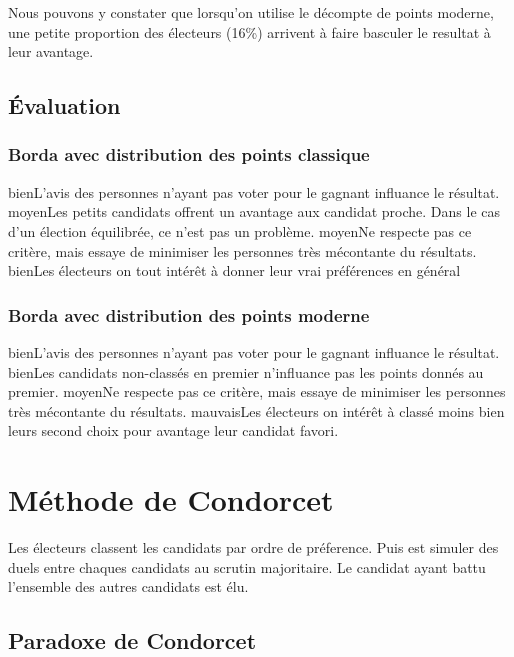 \documentclass[../report]{subfiles}
\begin{document}
  Nous pouvons y constater que lorsqu'on utilise le décompte de points moderne, une petite 
  proportion des électeurs (16\%) arrivent à faire basculer le resultat à leur avantage.


  \subsection{Évaluation}
  \subsubsection{Borda avec distribution des points classique}
  \tabcritere%
    {bien}{L'avis des personnes n'ayant pas voter pour le gagnant influance le résultat.}%
    {moyen}{Les petits candidats offrent un avantage aux candidat proche. Dans le cas d'un élection équilibrée, ce n'est pas un problème.}%
    {moyen}{Ne respecte pas ce critère, mais essaye de minimiser les personnes très mécontante du résultats.}%
    {bien}{Les électeurs on tout intérêt à donner leur vrai préférences en général}
  \subsubsection{Borda avec distribution des points moderne}
  \tabcritere%
    {bien}{L'avis des personnes n'ayant pas voter pour le gagnant influance le résultat.}%
    {bien}{Les candidats non-classés en premier n'influance pas les points donnés au premier.}%
    {moyen}{Ne respecte pas ce critère, mais essaye de minimiser les personnes très mécontante du résultats.}%
    {mauvais}{Les électeurs on intérêt à classé moins bien leurs second choix pour avantage leur candidat favori.}


  \section{Méthode de Condorcet}

  Les électeurs classent les candidats par ordre de préference. 
  Puis est simuler des duels entre chaques candidats au scrutin majoritaire.
  Le candidat ayant battu l'ensemble des autres candidats est élu.

  \subsection{Paradoxe de Condorcet}
\end{document}
